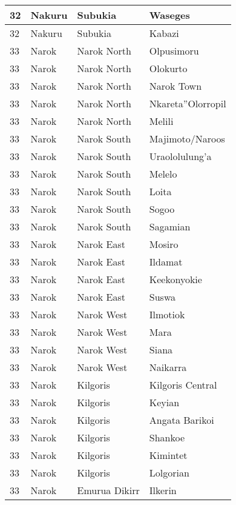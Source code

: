 \begin{table}[!ht]
\begin{tabular}{|l|l|l|l|}
        32 & Nakuru & Subukia & Waseges \\ \hline
        32 & Nakuru & Subukia & Kabazi \\ \hline
        33 & Narok & Narok North & Olpusimoru \\ \hline
        33 & Narok & Narok North & Olokurto \\ \hline
        33 & Narok & Narok North & Narok Town \\ \hline
        33 & Narok & Narok North & Nkareta''Olorropil \\ \hline
        33 & Narok & Narok North & Melili \\ \hline
        33 & Narok & Narok South & Majimoto/Naroos \\ \hline
        33 & Narok & Narok South & Uraololulung’a \\ \hline
        33 & Narok & Narok South & Melelo \\ \hline
        33 & Narok & Narok South & Loita \\ \hline
        33 & Narok & Narok South & Sogoo \\ \hline
        33 & Narok & Narok South & Sagamian \\ \hline
        33 & Narok & Narok East & Mosiro \\ \hline
        33 & Narok & Narok East & Ildamat \\ \hline
        33 & Narok & Narok East & Keekonyokie \\ \hline
        33 & Narok & Narok East & Suswa \\ \hline
        33 & Narok & Narok West & Ilmotiok \\ \hline
        33 & Narok & Narok West & Mara \\ \hline
        33 & Narok & Narok West & Siana \\ \hline
        33 & Narok & Narok West & Naikarra \\ \hline
        33 & Narok & Kilgoris & Kilgoris Central \\ \hline
        33 & Narok & Kilgoris & Keyian \\ \hline
        33 & Narok & Kilgoris & Angata Barikoi \\ \hline
        33 & Narok & Kilgoris & Shankoe \\ \hline
        33 & Narok & Kilgoris & Kimintet \\ \hline
        33 & Narok & Kilgoris & Lolgorian \\ \hline
        33 & Narok & Emurua Dikirr & Ilkerin \\ \hline

\end{tabular}
\end{table}
